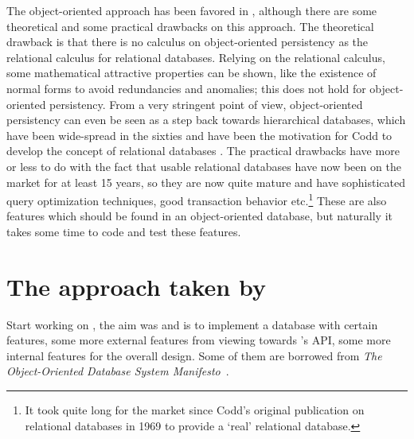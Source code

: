 The object-oriented approach has been favored in \plobwoexcl, although
there are some theoretical and some practical drawbacks on this
approach.  The theoretical drawback is that there is no calculus
on object-oriented persistency as the relational calculus for
relational databases. Relying on the relational calculus, some
mathematical attractive properties can be shown, like the existence of
normal forms to avoid redundancies and anomalies; this does not hold
for object-oriented persistency. From a very stringent point of view,
object-oriented persistency can even be seen as a step back towards
hierarchical databases, which have been wide-spread in the sixties and
have been the motivation for Codd to develop the concept of relational
databases \cite{bib:Codd-79}. The practical drawbacks
have more or
less to do with the fact that usable relational databases have now
been on the market for at least 15 years, so they are now quite mature
and have sophisticated query optimization techniques, good transaction
behavior etc.\footnote{It took quite long for the market since Codd's
  original publication on relational databases in 1969 to provide a
  `real' relational database.} These are also features which should be
found in an object-oriented database, but naturally it takes some time
to code and test these features.

\section[The approach taken by PLOB]{The approach taken by \protect\plob}

Start working on \plobwoexcl, the aim was and is to implement a
database with certain features, some more external features from
viewing towards \plobwoexcl's API, some more internal features for the
overall design. Some of them are borrowed from \emph{The
  Object-Oriented Database System Manifesto}\ 
\cite{bib:Atkinson-et-al-92}.

